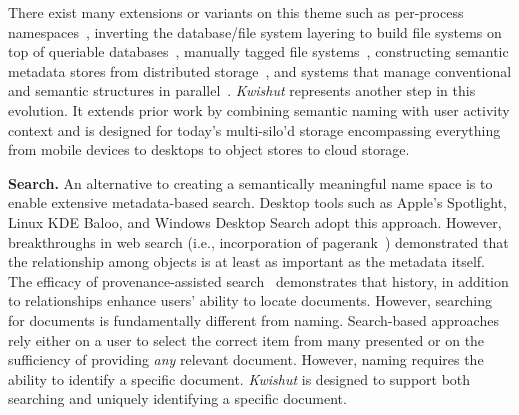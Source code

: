 There exist many extensions or variants on this theme such as per-process
namespaces~\cite{plan9}, inverting the database/file system layering to build
file systems on top of queriable databases~\cite{inversion},
manually tagged file systems~\cite{tagfs},
constructing semantic metadata stores from distributed
storage~\cite{smartstore}, and systems that manage conventional and semantic
structures in parallel~\cite{gfs}.
\emph{Kwishut} represents another step in this evolution.
It extends prior work by combining semantic naming with user activity context
and is designed for today's multi-silo'd storage encompassing everything from
mobile devices to desktops to object stores to cloud storage.


\noindent\textbf{Search.}
An alternative to creating a semantically meaningful name space is to enable extensive metadata-based search.
Desktop tools such as Apple’s Spotlight, Linux KDE Baloo, and Windows
Desktop Search adopt this approach.
However, breakthroughs in web search (i.e., incorporation of pagerank~\cite{page1999pagerank}) demonstrated that the relationship among objects is at least as important as the metadata itself.
The efficacy of provenance-assisted search~\cite{provsearch,uprove2,pindex} demonstrates that history, in addition to relationships enhance users' ability to locate documents.
However, searching for documents is fundamentally different from naming.
Search-based approaches rely either on a user to select the correct item from many presented or on the sufficiency of providing \emph{any} relevant document.
However, naming requires the ability to identify a specific document. \emph{Kwishut} is designed to support both searching and uniquely identifying a specific document.

